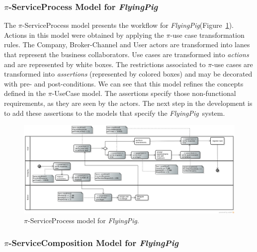 \documentclass{singlecol-new}
\theoremstyle{TH}{
\newtheorem{lemma}{Lemma}
\newtheorem{theorem}[lemma]{Theorem}
\newtheorem{corrolary}[lemma]{Corrolary}
\newtheorem{conjecture}[lemma]{Conjecture}
\newtheorem{proposition}[lemma]{Proposition}
\newtheorem{claim}[lemma]{Claim}
\newtheorem{stheorem}[lemma]{Wrong Theorem}
\newtheorem{algorithm}{Algorithm}
}
\theoremstyle{THrm}{
\newtheorem{definition}{Definition}[section]
\newtheorem{question}{Question}[section]
\newtheorem{remark}{Remark}
\newtheorem{scheme}{Scheme}
}
\theoremstyle{THhit}{
\newtheorem{case}{Case}[section]
}
\theoremstyle{THhsl}{
\newtheorem{example}{Example}
}
\def\FlyingPig{\textsl{FlyingPig}\xspace}
\begin{document}
\subsubsection{$\pi$-ServiceProcess Model for \FlyingPig}

The $\pi$-ServiceProcess model presents the workflow for \FlyingPig (Figure~\ref{fig:PiServiceProcessModel}).
Actions in this model were obtained by applying the $\pi$-use case transformation rules.
The \textsf{Company}, \textsf{Broker-Channel} and \textsf{User} actors are transformed into lanes that represent the business collaborators.
Use cases are transformed into \textit{actions} and are represented by white boxes.
The restrictions associated to  $\pi$-use cases are transformed into \textit{assertions} (represented by colored boxes) and may be decorated with pre- and post-conditions.
We can see that this model refines the concepts defined in the $\pi$-UseCase model.
The assertions specify those non-functional requirements, as they are seen by the actors.
The next step in the development is to add these assertions to the models that specify the \FlyingPig\ system.

\begin{figure}[h]
\centering
\includegraphics[width=1.0\textwidth]{./figures/ServiceProcessGeneralCut.png}
\caption{$\pi$-ServiceProcess model for \FlyingPig.\label{fig:PiServiceProcessModel}}
\end{figure}

\subsubsection{$\pi$-ServiceComposition Model for \FlyingPig}
\end{document}
